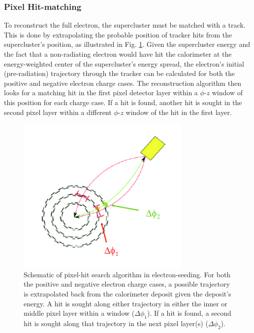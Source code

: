 
\subsubsection{Pixel Hit-matching}
\label{evReco:pixMatch}

To reconstruct the full electron, 
the supercluster must be matched with a track.  
This is done by extrapolating the probable position of 
tracker hits from the supercluster's position, 
as illustrated in Fig. \ref{fig:PixMatch}.  
Given the supercluster energy and the fact that a 
non-radiating electron would have hit the calorimeter 
at the energy-weighted center of the supercluster's 
energy spread, 
the electron's initial (pre-radiation) trajectory 
through the tracker can be calculated 
for both the positive and negative electron 
charge cases.  
The reconstruction algorithm then looks for a matching 
hit in the first pixel detector layer 
within a $\phi$-$z$ window of this position 
for each charge case.  
If a hit is found, another hit is sought in the second 
pixel layer within a different $\phi$-$z$ window 
of the hit in the first layer.  


 \begin{figure}[htb]
  \begin{center}
    \includegraphics[width=240pt]{Figures/elec-pixmatch.png}
  \end{center}
  \caption[\fixspacing Schematic of pixel-hit search algorithm in electron-seeding]
	  {\fixspacing Schematic of pixel-hit search algorithm in electron-seeding. 
	    For both the positive and negative electron charge cases, 
	    a possible trajectory is extrapolated back from the calorimeter deposit 
	    given the deposit's energy. 
	    A hit is sought along either trajectory in either the inner or 
	    middle pixel layer within a window ($\Delta\phi_1$). 
	    If a hit is found, a second hit is sought along that trajectory 
	    in the next pixel layer(s) ($\Delta\phi_2$).}
  \label{fig:PixMatch}
 \end{figure}

